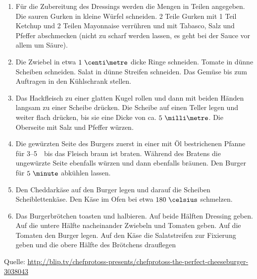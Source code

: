 \begin{enumerate}
 \item Für die Zubereitung des Dressings werden die Mengen in Teilen angegeben.
	Die sauren Gurken in kleine Würfel schneiden.
	2 Teile Gurken mit 1 Teil Ketchup und 2 Teilen Mayonnaise verrühren und mit Tabasco, Salz und Pfeffer abschmecken (nicht zu scharf werden lassen, es geht bei der Sauce vor allem um Säure).
 \item Die Zwiebel in etwa $1~\centi\metre$ dicke Ringe schneiden.
	Tomate in dünne Scheiben schneiden.
	Salat in dünne Streifen schneiden.
	Das Gemüse bis zum Auftragen in den Kühlschrank stellen.
 \item Das Hackfleisch zu einer glatten Kugel rollen und dann mit beiden Händen langsam zu einer Scheibe drücken.
	Die Scheibe auf einen Teller legen und weiter flach drücken, bis sie eine Dicke von ca. $5~\milli\metre$.
	Die Oberseite mit Salz und Pfeffer würzen.
 \item Die gewürzten Seite des Burgers zuerst in einer mit Öl bestrichenen Pfanne für 3--5~\minute\ bis das Fleisch braun ist braten.
	Während des Bratens die ungewürzte Seite ebenfalls würzen und dann ebenfalls bräunen.
	Den Burger für $5~\minute$ abkühlen lassen.
 \item Den Cheddarkäse auf den Burger legen und darauf die Scheiben Scheiblettenkäse.
	Den Käse im Ofen bei etwa $180~\celsius$ schmelzen.
 \item Das Burgerbrötchen toasten und halbieren.
	Auf beide Hälften Dressing geben.
	Auf die untere Hälfte nacheinander Zwiebeln und Tomaten geben.
	Auf die Tomaten den Burger legen.
	Auf den Käse die Salatstreifen zur Fixierung geben und die obere Hälfte des Brötchens drauflegen
\end{enumerate}

Quelle: \url{http://blip.tv/chefprotoss-presents/chefprotoss-the-perfect-cheeseburger-3038043}